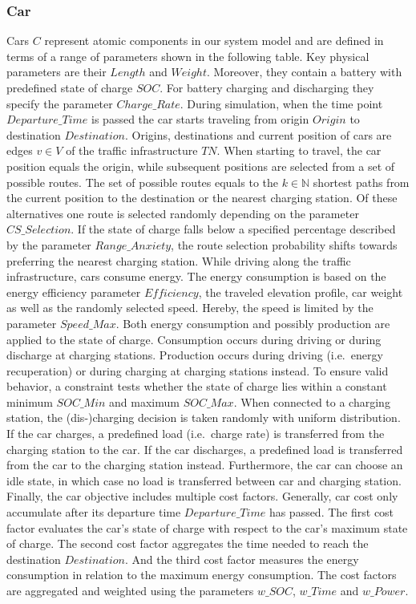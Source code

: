 \subsubsection*{Car}
\label{section:car}

Cars $C$ represent atomic components in our system model and are defined in terms of a range of parameters shown in the following table. Key physical parameters are their $Length$ and $Weight$. Moreover, they contain a battery with predefined state of charge $SOC$. For battery charging and discharging they specify the parameter $Charge\_Rate$. During simulation, when the time point $Departure\_Time$ is passed the car starts traveling from origin $Origin$ to destination $Destination$. Origins, destinations and current position of cars are edges $v \in V$ of the traffic infrastructure $TN$. When starting to travel, the car position equals the origin, while subsequent positions are selected from a set of possible routes. The set of possible routes equals to the $k \in \mathbb{N}$ shortest paths from the current position to the destination or the nearest charging station. Of these alternatives one route is selected randomly depending on the parameter $CS\_Selection$. If the state of charge falls below a specified percentage described by the parameter $Range\_Anxiety$, the route selection probability shifts towards preferring the nearest charging station. While driving along the traffic infrastructure, cars consume energy. The energy consumption is based on the energy efficiency parameter $Efficiency$, the traveled elevation profile, car weight as well as the randomly selected speed. Hereby, the speed is limited by the parameter $Speed\_Max$. Both energy consumption and possibly production are applied to the state of charge. Consumption occurs during driving or during discharge at charging stations. Production occurs during driving (i.e.\ energy recuperation) or during charging at charging stations instead. To ensure valid behavior, a constraint tests whether the state of charge lies within a constant minimum $SOC\_Min$ and maximum $SOC\_Max$. When connected to a charging station, the (dis-)charging decision is taken randomly with uniform distribution. If the car charges, a predefined load (i.e.\ charge rate) is transferred from the charging station to the car. If the car discharges, a predefined load is transferred from the car to the charging station instead. Furthermore, the car can choose an idle state, in which case no load is transferred between car and charging station. Finally, the car objective includes multiple cost factors. Generally, car cost only accumulate after its departure time $Departure\_Time$ has passed. The first cost factor evaluates the car's state of charge with respect to the car's maximum state of charge. The second cost factor aggregates the time needed to reach the destination $Destination$. And the third cost factor measures the energy consumption in relation to the maximum energy consumption. The cost factors are aggregated and weighted using the parameters $w\_SOC$, $w\_Time$ and $w\_Power$.

